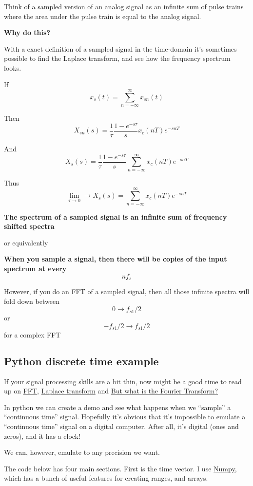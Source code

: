 Think of a sampled version of an analog signal as an infinite sum of
pulse trains where the area under the pulse train is equal to the analog
signal.

\textbf{Why do this?}

With a exact definition of a sampled signal in the time-domain it's
sometimes possible to find the Laplace transform, and see how the
frequency spectrum looks.

If \[ x_s(t) = \sum_{n=-\infty}^{\infty}{x_{sn}(t)}\]

Then
\[ X_{sn}(s) = \frac{1}{\tau}\frac{1 - e^{-s\tau}}{s} x_c(nT)e^{-snT} \]

And
\[ X_s(s) = \frac{1}{\tau}\frac{1 - e^{-s\tau}}{s} \sum_{n=-\infty}^{\infty}x_c(nT)e^{-snT}\]

Thus
\[ \lim_{\tau \to 0} \rightarrow X_s(s) = \sum_{n=-\infty}^{\infty}x_c(nT)e^{-snT}\]

\textbf{The spectrum of a sampled signal is an infinite sum of frequency
shifted spectra}

or equivalently

\textbf{When you sample a signal, then there will be copies of the input
spectrum at every \[ nf_s\]}

However, if you do an FFT of a sampled signal, then all those infinite
spectra will fold down between \[ 0 \to f_{s1}/2\] or
\[- f_{s1}/2 \to f_{s1}/2\] for a complex FFT

\subsection{Python discrete time
example}\label{python-discrete-time-example}

If your signal processing skills are a bit thin, now might be a good
time to read up on
\href{https://en.wikipedia.org/wiki/Fast_Fourier_transform}{FFT},
\href{https://en.wikipedia.org/wiki/Laplace_transform}{Laplace
transform} and \href{https://www.youtube.com/watch?v=spUNpyF58BY}{But
what is the Fourier Transform?}

In python we can create a demo and see what happens when we ``sample'' a
``continuous time'' signal. Hopefully it's obvious that it's impossible
to emulate a ``continuous time'' signal on a digital computer. After
all, it's digital (ones and zeros), and it has a clock!

We can, however, emulate to any precision we want.

The code below has four main sections. First is the time vector. I use
\href{https://numpy.org}{Numpy}, which has a bunch of useful features
for creating ranges, and arrays.

